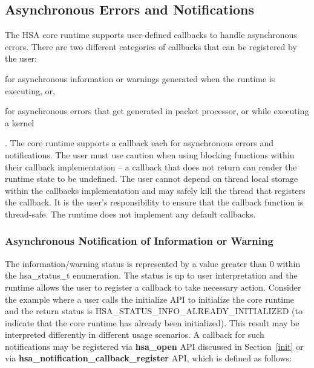 \documentclass{book}
\newcommand{\reffun}[1]{\textbf{#1}}
\newcommand{\reftyp}[1]{#1}
\newcommand{\refenu}[1]{\reftyp{#1}}
\newenvironment{DIFnomarkup}{}{}
\begin{document}


\begin{DIFnomarkup}
\hypertarget{asyncerror}{}\subsection{Asynchronous Errors and
Notifications}\label{asyncerror}
\end{DIFnomarkup}

The HSA core runtime supports user-defined callbacks to handle
asynchronous errors. There are two different categories of callbacks
that can be registered by the user: \begin{inparaenum}[(i)] \item
for asynchronous information or warnings generated when the runtime
is executing, or, \item for asynchronous errors that get generated
in packet processor, or while executing a kernel \end{inparaenum}.
The core runtime supports a callback each for asynchronous errors
and notifications.
The user must use caution when using blocking functions within their
callback implementation -- a callback that does not return can
render the runtime state to be undefined. The user cannot depend on
thread local storage within the callbacks implementation and may
safely kill the thread that registers the callback. It is the user's
responsibility to ensure that the callback function is thread-safe.
The runtime does not implement any default callbacks.

\subsubsection{Asynchronous Notification of Information or
Warning}\label{asynnotif}

The information/warning status is represented by a value greater
than 0 within the \reftyp{hsa\_status\_t} enumeration. The status is
up to user interpretation and the runtime allows the user to
register a callback to take necessary action. Consider the example
where a user calls the initialize API to initialize the core runtime
and the return status is
\refenu{HSA\_STATUS\_INFO\_ALREADY\_INITIALIZED} (to indicate that
the core runtime has already been initialized). This result may be
interpreted differently in different usage scenarios. A callback for
such notifications may be registered via \reffun{hsa\_open} API
discussed in Section~\ref{init} or via
\reffun{hsa\_notification\_callback\_register} API, which is defined
as follows:
\end{document}
